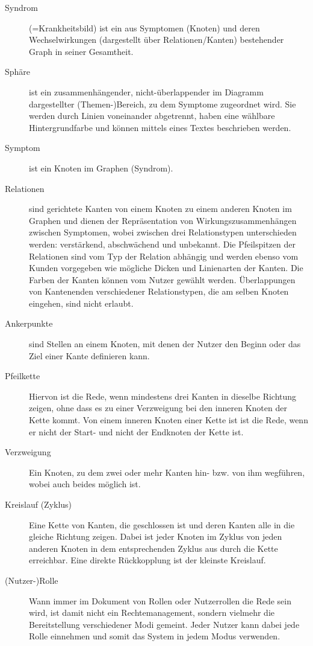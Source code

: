 \documentclass[enabledeprecatedfontcommands,fontsize=11pt,paper=a4,twoside]{scrartcl}
\newcounter{one}
\begin{document}
\begin{description}
	\item[Syndrom] (=Krankheitsbild) ist ein aus Symptomen (Knoten) und deren Wechselwirkungen (dargestellt über Relationen/Kanten) bestehender Graph in seiner Gesamtheit. 
	\item[\hypertarget{Sphaere}{Sphäre}] ist ein zusammenhängender, nicht-überlappender im Diagramm dargestellter (Themen-)Bereich, zu dem Symptome zugeordnet wird. Sie werden durch Linien voneinander abgetrennt, haben eine wählbare Hintergrundfarbe und können mittels eines Textes beschrieben werden. 
	\item[\hypertarget{Symptom}{Symptom}] ist ein Knoten im Graphen (Syndrom). 
	\item[Relationen] sind gerichtete Kanten von einem Knoten zu einem anderen Knoten im Graphen und dienen der Repräsentation von Wirkungszusammenhängen zwischen Symptomen, wobei zwischen drei Relationstypen unterschieden werden: verstärkend, abschwächend und unbekannt. Die Pfeilspitzen der Relationen sind vom Typ der Relation abhängig und werden ebenso vom Kunden vorgegeben wie mögliche Dicken und Linienarten der Kanten. Die Farben der Kanten können vom Nutzer gewählt werden. Überlappungen von Kantenenden verschiedener Relationstypen, die am selben Knoten eingehen, sind nicht erlaubt.
	\item[Ankerpunkte] sind Stellen an einem Knoten, mit denen der Nutzer den Beginn oder das Ziel einer Kante definieren kann. 
	\item[Pfeilkette] Hiervon ist die Rede, wenn mindestens drei Kanten in dieselbe Richtung zeigen, ohne dass es zu einer Verzweigung bei den inneren Knoten der Kette kommt. Von einem inneren Knoten einer Kette ist ist die Rede, wenn er nicht der Start- und nicht der Endknoten der Kette ist. 
	\item[Verzweigung] Ein Knoten, zu dem zwei oder mehr Kanten hin- bzw. von ihm wegführen, wobei auch beides möglich ist. 
	\item[\hypertarget{Kreislauf}{Kreislauf (Zyklus)}] Eine Kette von Kanten, die geschlossen ist und deren Kanten alle in die gleiche Richtung zeigen. Dabei ist jeder Knoten im Zyklus von jeden anderen Knoten in dem entsprechenden Zyklus aus durch die Kette erreichbar. Eine direkte Rückkopplung ist der kleinste Kreislauf.
	\item[(Nutzer-)Rolle] Wann immer im Dokument von Rollen oder Nutzerrollen die Rede sein wird, ist damit nicht ein Rechtemanagement, sondern vielmehr die Bereitstellung verschiedener Modi gemeint. Jeder Nutzer kann dabei jede Rolle einnehmen und somit das System in jedem Modus verwenden.

\end{description}
\end{document}
